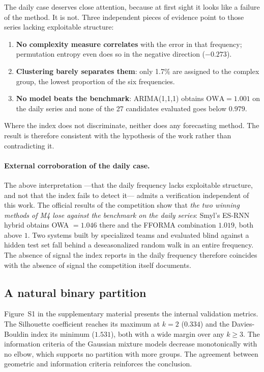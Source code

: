 The daily case deserves close attention, because at first sight it looks like a failure of
the method. It is not. Three independent pieces of evidence point to those series lacking
exploitable structure:

\begin{enumerate}
\item \textbf{No complexity measure correlates} with the error in that frequency;
      permutation entropy even does so in the negative direction ($-0.273$).
\item \textbf{Clustering barely separates them}: only 1.7\% are assigned to the complex
      group, the lowest proportion of the six frequencies.
\item \textbf{No model beats the benchmark}: ARIMA(1,1,1) obtains $\mathrm{OWA}=1.001$ on
      the daily series and none of the 27 candidates evaluated goes below $0.979$.
\end{enumerate}

Where the index does not discriminate, neither does any forecasting method. The result is
therefore consistent with the hypothesis of the work rather than contradicting it.

\paragraph{External corroboration of the daily case.} The above interpretation ---that the
daily frequency lacks exploitable structure, and not that the index fails to detect
it--- admits a verification independent of this work. The official results of the
competition \cite{m4results} show that \emph{the two winning methods of M4 lose against
the benchmark on the daily series}: Smyl's ES-RNN hybrid obtains OWA $=1.046$ there and
the FFORMA combination $1.019$, both above $1$. Two systems built by specialized teams and
evaluated blind against a hidden test set fall behind a deseasonalized random walk in an
entire frequency. The absence of signal the index reports in the daily frequency therefore
coincides with the absence of signal the competition itself documents.

\subsection{A natural binary partition}\label{sec:clusters}

Figure~S1 in the supplementary material presents the internal validation metrics. The
Silhouette coefficient reaches its maximum at $k=2$ ($0.334$) and the Davies-Bouldin index
its minimum ($1.531$), both with a wide margin over any $k\geq3$. The information criteria
of the Gaussian mixture models decrease monotonically with no elbow, which supports no
partition with more groups. The agreement between geometric and information criteria
reinforces the conclusion.

